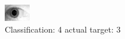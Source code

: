 \begin{figure}[h!]
\begin{center}
\includegraphics[width=0.60\columnwidth]{figures/ID1803_class_4_target_3.png}
\end{center}
\caption{ Classification: 4 actual target: 3}
\label{fig:ID1803_class_4_target_3}
\end{figure}
